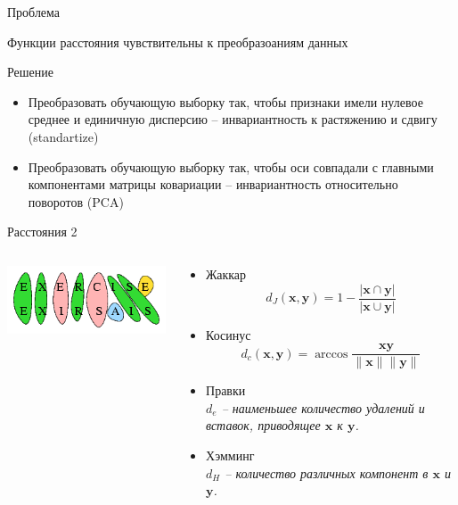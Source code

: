 \documentclass[10pt]{beamer}
\begin{document}
\begin{frame}{Проблема}

Функции расстояния чувствительны к преобразоаниям данных

\vspace{1em}
Решение
\begin{itemize}
\item Преобразовать обучающую выборку так, чтобы  признаки имели нулевое среднее и единичную дисперсию -- инвариантность к растяжению и сдвигу (standartize)
\item Преобразовать обучающую выборку так, чтобы оси совпадали с главными компонентами матрицы ковариации -- инвариантность относительно поворотов (PCA)
\end{itemize}


\end{frame}

\begin{frame}{Расстояния 2}

\begin{columns}[T]

    \begin{column}{.4\textwidth}
    \vspace{5em}
	\begin{center}
   		\includegraphics[scale=0.5]{images/edit.png}
    \end{center}
    \end{column}
       
    \begin{column}{.6\textwidth}
    \begin{itemize}
		\item Жаккар
		\[
		d_J(\mathbf{x}, \mathbf{y}) = 1 - \frac{|\mathbf{x} \cap \mathbf{y}|}{|\mathbf{x} \cup \mathbf{y}|}
		\]
		\item Косинус
		\[
		d_c(\mathbf{x}, \mathbf{y}) = \arccos \frac{\mathbf{x} \mathbf{y}}{\|\mathbf{x}\| \|\mathbf{y}\|}
		\]
		\item Правки \\
		{\it $d_e$ -- наименьшее количество удалений и вставок, приводящее $\mathbf{x}$ к $\mathbf{y}$.}
		\item Хэмминг \\
		{\it $d_H$ -- количество различных компонент в $\mathbf{x}$ и $\mathbf{y}$.}
	\end{itemize}
    
    \end{column}
  \end{columns}

\end{frame}
\end{document}
